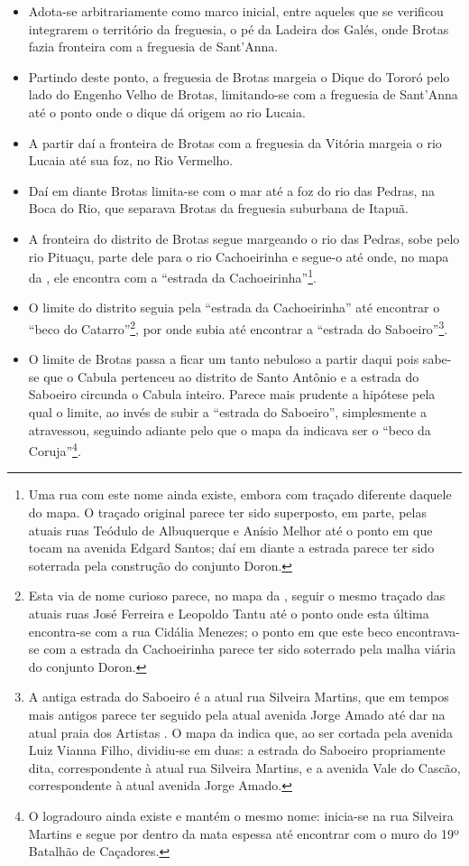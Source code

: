 \begin{itemize}
\item Adota-se arbitrariamente como marco inicial, entre aqueles que se verificou integrarem o território da freguesia, o pé da Ladeira dos Galés, onde Brotas fazia fronteira com a freguesia de Sant'Anna.
\item Partindo deste ponto, a freguesia de Brotas margeia o Dique do Tororó pelo lado do Engenho Velho de Brotas, limitando-se com a freguesia de Sant'Anna até o ponto onde o dique dá origem ao rio Lucaia.
\item A partir daí a fronteira de Brotas com a freguesia da Vitória margeia o rio Lucaia até sua foz, no Rio Vermelho.
\item Daí em diante Brotas limita-se com o mar até a foz do rio das Pedras, na Boca do Rio, que separava Brotas da freguesia suburbana de Itapuã.
\item A fronteira do distrito de Brotas segue margeando o rio das Pedras, sobe pelo rio Pituaçu, parte dele para o rio Cachoeirinha e segue-o até onde, no mapa da , ele encontra com a ``estrada da Cachoeirinha''\footnote{Uma rua com este nome ainda existe, embora com traçado diferente daquele do mapa. O traçado original parece ter sido superposto, em parte, pelas atuais ruas Teódulo de Albuquerque e Anísio Melhor até o ponto em que tocam na avenida Edgard Santos; daí em diante a estrada parece ter sido soterrada pela construção do conjunto Doron.}.
\item O limite do distrito seguia pela ``estrada da Cachoeirinha'' até encontrar o ``beco do Catarro''\footnote{Esta via de nome curioso parece, no mapa da , seguir o mesmo traçado das atuais ruas José Ferreira e Leopoldo Tantu até o ponto onde esta última encontra-se com a rua Cidália Menezes; o ponto em que este beco encontrava-se com a estrada da Cachoeirinha parece ter sido soterrado pela malha viária do conjunto Doron.}, por onde subia até encontrar a ``estrada do Saboeiro''\footnote{A antiga estrada do Saboeiro é a atual rua Silveira Martins, que em tempos mais antigos parece ter seguido pela atual avenida Jorge Amado até dar na atual praia dos Artistas \cite{souza_guia_1935}. O mapa da  indica que, ao ser cortada pela avenida Luiz Vianna Filho, dividiu-se em duas: a estrada do Saboeiro propriamente dita, correspondente à atual rua Silveira Martins, e a avenida Vale do Cascão, correspondente à atual avenida Jorge Amado.}.
\item O limite de Brotas passa a ficar um tanto nebuloso a partir daqui  pois sabe-se que o Cabula pertenceu ao distrito de Santo Antônio e a estrada do Saboeiro circunda o Cabula inteiro. Parece mais prudente a hipótese pela qual o limite, ao invés de subir a ``estrada do Saboeiro'', simplesmente a atravessou, seguindo adiante pelo que o mapa da  indicava ser o ``beco da Coruja''\footnote{O logradouro ainda existe e mantém o mesmo nome: inicia-se na rua Silveira Martins e segue por dentro da mata espessa até encontrar com o muro do 19º Batalhão de Caçadores.}.

\end{itemize}

